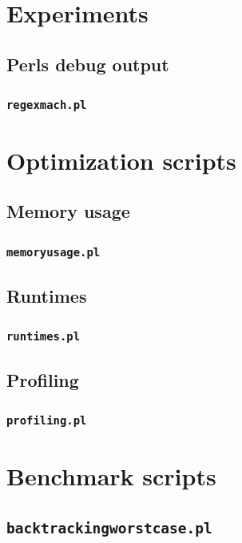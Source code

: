 \section{Experiments}
\subsection{Perls debug output}
\subsubsection{\texttt{regexmach.pl}}
\label{sec:regexmach.pl}



\section{Optimization scripts}
\subsection{Memory usage}
\subsubsection{\texttt{memoryusage.pl}}
\label{sec:memoryusage.pl}


\subsection{Runtimes}
\subsubsection{\texttt{runtimes.pl}}
\label{sec:runtimes.pl}


\subsection{Profiling}
\subsubsection{\texttt{profiling.pl}}
\label{sec:profiling.pl}



\section{Benchmark scripts}
\subsection{\texttt{backtrackingworstcase.pl}}
\label{sec:backtrackingworstcase.pl}



